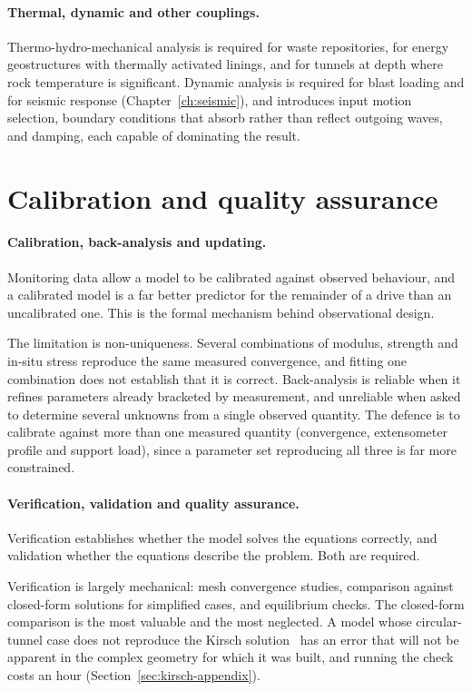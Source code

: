 \paragraph{Thermal, dynamic and other couplings.}
Thermo-hydro-mechanical analysis is required for waste repositories, for
energy geostructures with thermally activated linings, and for tunnels at
depth where rock temperature is significant. Dynamic analysis is required for
blast loading and for seismic response (Chapter~\ref{ch:seismic}), and
introduces input motion selection, boundary conditions that absorb rather than
reflect outgoing waves, and damping, each capable of dominating the result.

\section{Calibration and quality assurance}
\label{sec:calibration-qa}

\paragraph{Calibration, back-analysis and updating.}
Monitoring data allow a model to be calibrated against observed behaviour, and
a calibrated model is a far better predictor for the remainder of a drive than
an uncalibrated one. This is the formal mechanism behind observational design.

The limitation is non-uniqueness. Several combinations of modulus, strength
and in-situ stress reproduce the same measured convergence, and fitting one
combination does not establish that it is correct. Back-analysis is reliable
when it refines parameters already bracketed by measurement, and unreliable
when asked to determine several unknowns from a single observed quantity. The
defence is to calibrate against more than one measured quantity
(convergence, extensometer profile and support load), since a parameter
set reproducing all three is far more constrained.

\paragraph{Verification, validation and quality assurance.}
Verification establishes whether the model solves the equations correctly,
and validation whether the equations describe the problem. Both are
required.

Verification is largely mechanical: mesh convergence studies, comparison
against closed-form solutions for simplified cases, and equilibrium checks.
The closed-form comparison is the most valuable and the most neglected. A
model whose circular-tunnel case does not reproduce the Kirsch solution~\citep{kirsch1898} has an
error that will not be apparent in the complex geometry for which it was built,
and running the check costs an hour (Section~\ref{sec:kirsch-appendix}).

